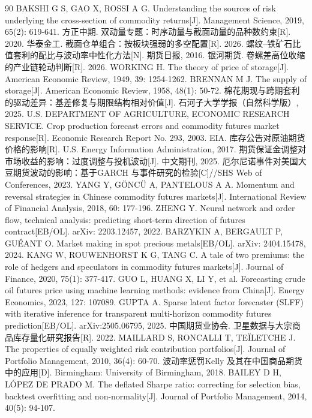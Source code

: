 \documentclass[12pt,a4paper]{ctexart}
\begin{document}
\begin{thebibliography}{90}
 BAKSHI G S, GAO X, ROSSI A G. Understanding the sources of risk underlying the cross-section of commodity returns[J]. Management Science, 2019, 65(2): 619-641.
 方正中期. 双动量专题：时序动量与截面动量的品种数约束[R]. 2020.
 华泰金工. 截面仓单组合：按板块强弱的多空配置[R]. 2026.
 螺纹–铁矿石比值套利的配比与波动率中性化方法[N]. 期货日报, 2016.
 银河期货. 卷螺差高位收缩的产业链轮动判断[R]. 2026.
 WORKING H. The theory of price of storage[J]. American Economic Review, 1949, 39: 1254-1262.
 BRENNAN M J. The supply of storage[J]. American Economic Review, 1958, 48(1): 50-72.
 棉花期现与跨期套利的驱动差异：基差修复与期限结构相对价值[J]. 石河子大学学报（自然科学版）, 2025.
 U.S. DEPARTMENT OF AGRICULTURE, ECONOMIC RESEARCH SERVICE. Crop production forecast errors and commodity futures market response[R]. Economic Research Report No. 293, 2003.
 EIA. 库存公告对原油期货价格的影响[R]. U.S. Energy Information Administration, 2017.
 期货保证金调整对市场收益的影响：过度调整与投机波动[J]. 中文期刊, 2025.
 厄尔尼诺事件对美国大豆期货波动的影响：基于GARCH 与事件研究的检验[C]//SHS Web of Conferences, 2023.
 YANG Y, GÖNCÜ A, PANTELOUS A A. Momentum and reversal strategies in Chinese commodity futures markets[J]. International Review of Financial Analysis, 2018, 60: 177-196.
 ZHENG Y. Neural network and order flow, technical analysis: predicting short-term direction of futures contract[EB/OL]. arXiv: 2203.12457, 2022.
 BARZYKIN A, BERGAULT P, GUÉANT O. Market making in spot precious metals[EB/OL]. arXiv: 2404.15478, 2024.
 KANG W, ROUWENHORST K G, TANG C. A tale of two premiums: the role of hedgers and speculators in commodity futures markets[J]. Journal of Finance, 2020, 75(1): 377-417.
 GUO L, HUANG X, LI Y, et al. Forecasting crude oil futures price using machine learning methods: evidence from China[J]. Energy Economics, 2023, 127: 107089.
 GUPTA A. Sparse latent factor forecaster (SLFF) with iterative inference for transparent multi-horizon commodity futures prediction[EB/OL]. arXiv:2505.06795, 2025.
 中国期货业协会. 卫星数据与大宗商品库存量化研究报告[R]. 2022.
 MAILLARD S, RONCALLI T, TEÏLETCHE J. The properties of equally weighted risk contribution portfolios[J]. Journal of Portfolio Management, 2010, 36(4): 60-70.
 波动率惩罚Kelly 及其在中国商品期货中的应用[D]. Birmingham: University of Birmingham, 2018.
 BAILEY D H, LÓPEZ DE PRADO M. The deflated Sharpe ratio: correcting for selection bias, backtest overfitting and non-normality[J]. Journal of Portfolio Management, 2014, 40(5): 94-107.

\end{thebibliography}
\end{document}
